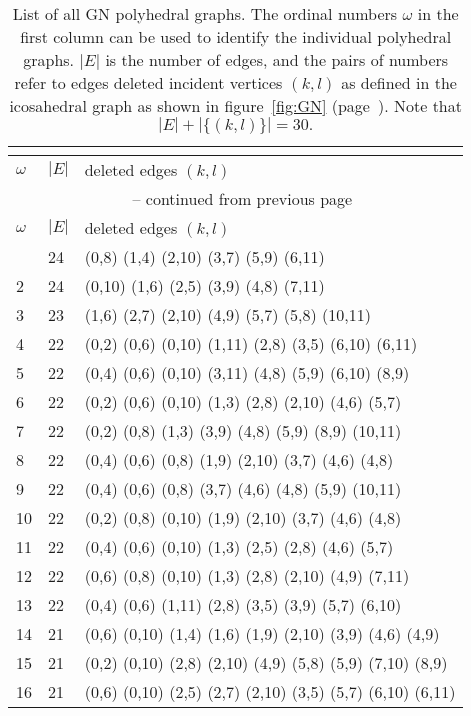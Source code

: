 \footnotesize{\begin{longtable}{lll}
    \caption{List of all \acs{GN} polyhedral graphs. The ordinal numbers $\omega$ in the first column
    can be used to identify the individual polyhedral graphs.
    $|E|$ is the number of edges, and the pairs of numbers refer to edges deleted
    incident vertices $(k,l)$ as defined in the icosahedral graph
    as shown in figure~\ref{fig:GN} (page~\pageref{fig:GN}). Note that $|E|+|\{(k,l)\}|=30.$}\\
    \label{tab:icosubgraphs}\\
%
\toprule
    $\omega$  & $|E|$  &  deleted edges $(k,l)$\\\midrule
\endfirsthead
\multicolumn{3}{c}{\tablename~\thetable{} -- continued from previous page}\\
\toprule
    $\omega$  & $|E|$  &  deleted edges $(k,l)$\\\midrule
\endhead
\bottomrule\endfoot
1   & 24 & (0,8) (1,4) (2,10) (3,7) (5,9) (6,11) \\
2   & 24 & (0,10) (1,6) (2,5) (3,9) (4,8) (7,11) \\
3   & 23 & (1,6) (2,7) (2,10) (4,9) (5,7) (5,8) (10,11) \\
4   & 22 & (0,2) (0,6) (0,10) (1,11) (2,8) (3,5) (6,10) (6,11) \\
5   & 22 & (0,4) (0,6) (0,10) (3,11) (4,8) (5,9) (6,10) (8,9) \\
6   & 22 & (0,2) (0,6) (0,10) (1,3) (2,8) (2,10) (4,6) (5,7) \\
7   & 22 & (0,2) (0,8) (1,3) (3,9) (4,8) (5,9) (8,9) (10,11) \\
8   & 22 & (0,4) (0,6) (0,8) (1,9) (2,10) (3,7) (4,6) (4,8) \\
9   & 22 & (0,4) (0,6) (0,8) (3,7) (4,6) (4,8) (5,9) (10,11) \\
10  & 22 & (0,2) (0,8) (0,10) (1,9) (2,10) (3,7) (4,6) (4,8) \\
11  & 22 & (0,4) (0,6) (0,10) (1,3) (2,5) (2,8) (4,6) (5,7) \\
12  & 22 & (0,6) (0,8) (0,10) (1,3) (2,8) (2,10) (4,9) (7,11) \\
13  & 22 & (0,4) (0,6) (1,11) (2,8) (3,5) (3,9) (5,7) (6,10) \\
14  & 21 & (0,6) (0,10) (1,4) (1,6) (1,9) (2,10) (3,9) (4,6) (4,9) \\
15  & 21 & (0,2) (0,10) (2,8) (2,10) (4,9) (5,8) (5,9) (7,10) (8,9) \\
16  & 21 & (0,6) (0,10) (2,5) (2,7) (2,10) (3,5) (5,7) (6,10) (6,11) \\

\end{longtable}}
